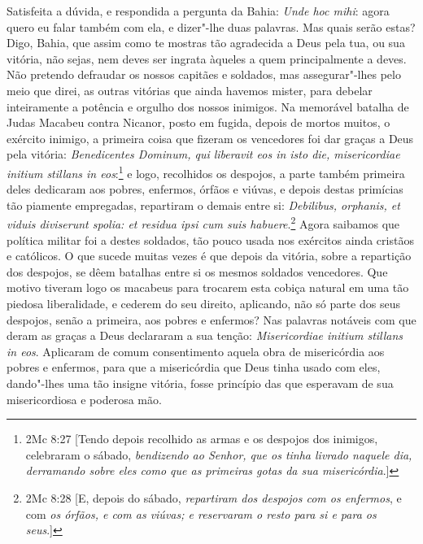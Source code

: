 Satisfeita a dúvida, e respondida a pergunta da Bahia: \emph{Unde hoc
mihi}: agora quero eu falar também com ela, e dizer"-lhe duas palavras.
Mas quais serão estas? Digo, Bahia, que assim como te mostras tão
agradecida a Deus pela tua, ou sua vitória, não sejas, nem deves ser
ingrata àqueles a quem principalmente a deves. Não pretendo defraudar os
nossos capitães e soldados, mas assegurar"-lhes pelo meio que direi, as
outras vitórias que ainda havemos mister, para debelar inteiramente a
potência e orgulho dos nossos inimigos. Na memorável batalha de Judas
Macabeu contra Nicanor, posto em fugida, depois de mortos muitos, o
exército inimigo, a primeira coisa que fizeram os vencedores foi dar
graças a Deus pela vitória: \emph{Benedicentes Dominum, qui liberavit
eos in isto die, misericordiae initium stillans in eos}:\footnote{2Mc 8:27 [Tendo depois recolhido as armas e os despojos dos inimigos, celebraram o sábado, \textit{bendizendo ao Senhor, que os tinha livrado naquele dia, derramando sobre eles como que as primeiras gotas da sua misericórdia}.]} e
logo, recolhidos os despojos, a parte também primeira deles dedicaram
aos pobres, enfermos, órfãos e viúvas, e depois destas primícias tão
piamente empregadas, repartiram o demais entre si: \emph{Debilibus,
orphanis, et viduis diviserunt spolia: et residua ipsi cum suis
habuere}.\footnote{2Mc 8:28 [E, depois do sábado, \textit{repartiram dos despojos com os enfermos}, e com \textit{os órfãos, e com as viúvas; e reservaram o resto para si e para os seus}.]} Agora saibamos que política militar foi a destes
soldados, tão pouco usada nos exércitos ainda cristãos e católicos. O
que sucede muitas vezes é que depois da vitória, sobre a repartição dos
despojos, se dêem batalhas entre si os mesmos soldados vencedores. Que
motivo tiveram logo os macabeus para trocarem esta cobiça natural em uma
tão piedosa liberalidade, e cederem do seu direito, aplicando, não só
parte dos seus despojos, senão a primeira, aos pobres e enfermos? Nas
palavras notáveis com que deram as graças a Deus declararam a sua
tenção: \emph{Misericordiae initium stillans in eos}.
Aplicaram de comum consentimento aquela obra de misericórdia aos pobres
e enfermos, para que a misericórdia que Deus tinha usado com eles,
dando"-lhes uma tão insigne vitória, fosse princípio das que esperavam de
sua misericordiosa e poderosa mão.

